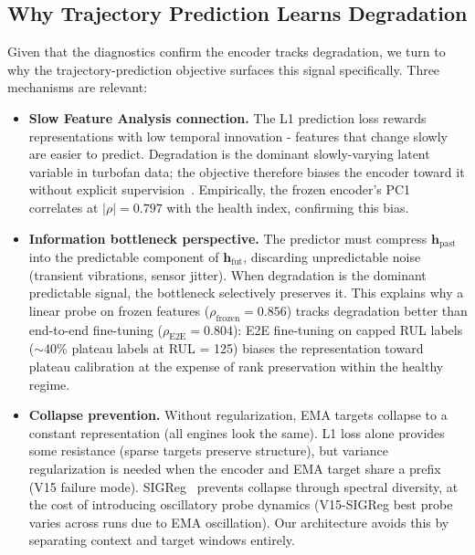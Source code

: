 \documentclass{article}
\newcommand{\h}{\mathbf{h}}
\begin{document}
\subsection{Why Trajectory Prediction Learns Degradation}
\label{sec:theory}

Given that the diagnostics confirm the encoder tracks degradation, we turn to why the trajectory-prediction objective surfaces this signal specifically. Three mechanisms are relevant:

\begin{itemize}[nosep]
  \item \textbf{Slow Feature Analysis connection.} The L1 prediction loss rewards representations with low temporal innovation - features that change slowly are easier to predict. Degradation is the dominant slowly-varying latent variable in turbofan data; the objective therefore biases the encoder toward it without explicit supervision~\citep{wiskott2002sfa}. Empirically, the frozen encoder's PC1 correlates at $|\rho| = 0.797$ with the health index, confirming this bias.
  \item \textbf{Information bottleneck perspective.} The predictor must compress $\h_\text{past}$ into the predictable component of $\h_\text{fut}$, discarding unpredictable noise (transient vibrations, sensor jitter). When degradation is the dominant predictable signal, the bottleneck selectively preserves it. This explains why a linear probe on frozen features ($\rho_\text{frozen} = 0.856$) tracks degradation better than end-to-end fine-tuning ($\rho_\text{E2E} = 0.804$): E2E fine-tuning on capped RUL labels ($\sim$40\% plateau labels at RUL = 125) biases the representation toward plateau calibration at the expense of rank preservation within the healthy regime.
  \item \textbf{Collapse prevention.} Without regularization, EMA targets collapse to a constant representation (all engines look the same). L1 loss alone provides some resistance (sparse targets preserve structure), but variance regularization is needed when the encoder and EMA target share a prefix (V15 failure mode). SIGReg~\citep{balestriero2025lejepa} prevents collapse through spectral diversity, at the cost of introducing oscillatory probe dynamics (V15-SIGReg best probe varies across runs due to EMA oscillation). Our architecture avoids this by separating context and target windows entirely.
\end{itemize}

\end{document}
